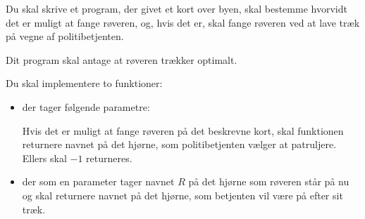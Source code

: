 \documentclass{boi2014-dk}
\begin{document}
    \Task
    Du skal skrive et program, der givet et kort over byen, skal
    bestemme hvorvidt det er muligt at fange røveren, og, hvis det
    er, skal fange røveren ved at lave træk på vegne af
    politibetjenten.

	Dit program skal antage at røveren trækker optimalt.

    \Implementation
    Du skal implementere to funktioner:
    \begin{itemize}
        \item {} der tager følgende parametre:
            Hvis det er muligt at fange røveren på det beskrevne kort, skal
            funktionen  returnere navnet på det hjørne, som
            politibetjenten vælger at patruljere. Ellers skal $-1$
            returneres.

        \item {} der som en parameter tager navnet $R$
		      på det hjørne som røveren står på nu og skal returnere
		      navnet på det hjørne, som betjenten vil være på efter sit
		      træk.
    \end{itemize}
\end{document}
